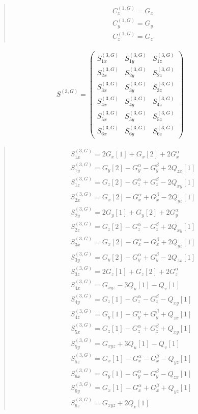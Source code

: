 \documentclass[fleqn,10pt]{jsarticle}
\begin{document}
\begin{quote}
\begin{align*}
& C^{(1,G)}_{x} = G_{x} \\
& C^{(1,G)}_{y} = G_{y} \\
& C^{(1,G)}_{z} = G_{z}
\end{align*}
\end{quote}
\begin{align*}
S^{(3,G)} = \begin{pmatrix} S^{(3,G)}_{1x} & S^{(3,G)}_{1y} & S^{(3,G)}_{1z} \\ S^{(3,G)}_{2x} & S^{(3,G)}_{2y} & S^{(3,G)}_{2z} \\ S^{(3,G)}_{3x} & S^{(3,G)}_{3y} & S^{(3,G)}_{3z} \\ S^{(3,G)}_{4x} & S^{(3,G)}_{4y} & S^{(3,G)}_{4z} \\ S^{(3,G)}_{5x} & S^{(3,G)}_{5y} & S^{(3,G)}_{5z} \\ S^{(3,G)}_{6x} & S^{(3,G)}_{6y} & S^{(3,G)}_{6z} \end{pmatrix}
\end{align*}
\begin{quote}
\begin{align*}
& S^{(3,G)}_{1x} = 2 G_{x}[1] + G_{x}[2] + 2 G_{x}^{\alpha} \\
& S^{(3,G)}_{1y} = G_{y}[2] - G_{y}^{\alpha} - G_{y}^{\beta} + 2 Q_{zx}[1] \\
& S^{(3,G)}_{1z} = G_{z}[2] - G_{z}^{\alpha} + G_{z}^{\beta} - 2 Q_{xy}[1] \\
& S^{(3,G)}_{2x} = G_{x}[2] - G_{x}^{\alpha} + G_{x}^{\beta} - 2 Q_{yz}[1] \\
& S^{(3,G)}_{2y} = 2 G_{y}[1] + G_{y}[2] + 2 G_{y}^{\alpha} \\
& S^{(3,G)}_{2z} = G_{z}[2] - G_{z}^{\alpha} - G_{z}^{\beta} + 2 Q_{xy}[1] \\
& S^{(3,G)}_{3x} = G_{x}[2] - G_{x}^{\alpha} - G_{x}^{\beta} + 2 Q_{yz}[1] \\
& S^{(3,G)}_{3y} = G_{y}[2] - G_{y}^{\alpha} + G_{y}^{\beta} - 2 Q_{zx}[1] \\
& S^{(3,G)}_{3z} = 2 G_{z}[1] + G_{z}[2] + 2 G_{z}^{\alpha} \\
& S^{(3,G)}_{4x} = G_{xyz} - 3 Q_{u}[1] - Q_{v}[1] \\
& S^{(3,G)}_{4y} = G_{z}[1] - G_{z}^{\alpha} - G_{z}^{\beta} - Q_{xy}[1] \\
& S^{(3,G)}_{4z} = G_{y}[1] - G_{y}^{\alpha} + G_{y}^{\beta} + Q_{zx}[1] \\
& S^{(3,G)}_{5x} = G_{z}[1] - G_{z}^{\alpha} + G_{z}^{\beta} + Q_{xy}[1] \\
& S^{(3,G)}_{5y} = G_{xyz} + 3 Q_{u}[1] - Q_{v}[1] \\
& S^{(3,G)}_{5z} = G_{x}[1] - G_{x}^{\alpha} - G_{x}^{\beta} - Q_{yz}[1] \\
& S^{(3,G)}_{6x} = G_{y}[1] - G_{y}^{\alpha} - G_{y}^{\beta} - Q_{zx}[1] \\
& S^{(3,G)}_{6y} = G_{x}[1] - G_{x}^{\alpha} + G_{x}^{\beta} + Q_{yz}[1] \\
& S^{(3,G)}_{6z} = G_{xyz} + 2 Q_{v}[1]
\end{align*}
\end{quote}
\end{document}

